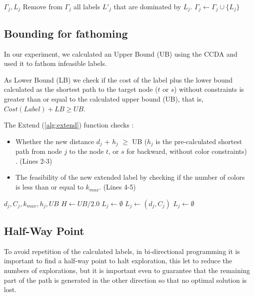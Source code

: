 \documentclass[pdflatex,sn-mathphys-num]{sn-jnl}
\begin{document}
\begin{algorithm}
\caption{Dominance check \& Adding Label (\texttt{AddLabel})}
\label{alg:addlabel}
\begin{algorithmic}[1]
\REQUIRE $\Gamma_j, L_j$
      \STATE Remove from $\Gamma_j$ all labels $L'_j$ that are dominated by $L_j$.
      \STATE $\Gamma_j \leftarrow \Gamma_j \cup \{L_j\}$
  \ENDIF
\end{algorithmic}
\end{algorithm}

\subsection{Bounding for fathoming}
In our experiment, we calculated an Upper Bound (UB) using the CCDA \cite{CerroneRusso2023} and used 
it to fathom infeasible labels.

As Lower Bound (LB) we check if the cost of the label plus the lower bound calculated as the shortest path to the target node ($t$ or $s$) without constraints is greater than or equal to the calculated upper bound (UB), that is, $Cost(Label) + LB \geq UB$.

The Extend (\ref{alg:extend}) function checks :
\begin{itemize}
    \item Whether the new distance $d_j$ + $h_j$ $\geq$ UB ($h_j$ is the pre-calculated shortest path from node $j$ to the node $t$, or $s$ for backward, without color constraints) . (Lines 2-3)
    \item The feasibility of the new extended label by checking if the number of colors is less than or equal to $k_{max}$. (Lines 4-5)
\end{itemize}

\begin{algorithm}
\caption{Extension of the label (\texttt{Extend})}
\label{alg:extend}
\begin{algorithmic}[1]
\REQUIRE $d_j, C_j, k_{max}, h_j, UB$
\STATE $H \leftarrow UB / 2.0$ 
   \RETURN $L_j \leftarrow \emptyset$
    \RETURN $L_j \leftarrow (d_j, C_j)$
\ELSE
    \RETURN $L_j \leftarrow \emptyset$
\ENDIF
\end{algorithmic}
\end{algorithm}

\subsection{Half-Way Point}
To avoid repetition of the calculated labels, in bi-directional programming it is important to find a half-way point to halt exploration,
this let to reduce the numbers of explorations, but it is important even to guarantee that the remaining part of the path is generated 
in the other direction so that no optimal solution is lost.
\end{document}
